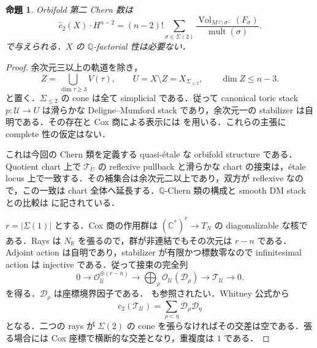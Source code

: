 \documentclass[12pt]{amsart}
\theoremstyle{definition}
\theoremstyle{remark}
\numberwithin{equation}{section}
\theoremstyle{plain}
\newtheorem{jprop}[thm]{命題}
\theoremstyle{definition}
\theoremstyle{remark}
\begin{document}
\begin{jprop}\label{ja:prop:chern}
Orbifold 第二 Chern 数は
\begin{equation}\label{ja:eq:chern}
 \widehat c_2(X)\cdot H^{n-2}
 =(n-2)!\sum_{\sigma\in\Sigma(2)}
 \frac{\operatorname{Vol}_{M\cap\sigma^\perp}(F_\sigma)}
      {\operatorname{mult}(\sigma)}.
\end{equation}
で与えられる．$X$ の $\mathbb Q$-factorial 性は必要ない．
\end{jprop}
\begin{proof}
余次元三以上の軌道を除き，
\begin{equation}\label{ja:eq:open}
 Z=\bigcup_{\dim\tau\ge3}V(\tau),\qquad
 U=X\setminus Z=X_{\Sigma_{\le2}},\qquad
 \dim Z\le n-3.
\end{equation}
と置く．$\Sigma_{\le2}$ の cone は全て simplicial である．従って canonical toric stack $p:\mathcal U\to U$ は滑らかな Deligne--Mumford stack であり，余次元一の stabilizer は自明である．その存在と Cox 商による表示には \cite[Theorem~4.11 and Corollary~4.13]{ja:FMN} を用いる．これらの主張に complete 性の仮定はない．

これは今回の Chern 類を定義する quasi-\'{e}tale な orbifold structure である．Quotient chart 上で $\mathcal T_U$ の reflexive pullback と滑らかな chart の接束は，\'{e}tale locus 上で一致する．その補集合は余次元二以上であり，双方が reflexive なので，この一致は chart 全体へ延長する．$\mathbb Q$-Chern 類の構成と smooth DM stack との比較は \cite[Theorem~3.13 and \S\S3.10--3.11 of the arXiv version]{ja:GKPT} に記されている．

$r=|\Sigma(1)|$ とする．Cox 商の作用群は $(\mathbb C^*)^r\to T_N$ の diagonalizable な核である．Rays は $N_{\mathbb R}$ を張るので，群が非連結でもその次元は $r-n$ である．Adjoint action は自明であり，stabilizer が有限かつ標数零なので infinitesimal action は injective である．従って接束の完全列
\begin{equation}\label{ja:eq:euler-stack}
 0\longrightarrow\mathcal O_{\mathcal U}^{\oplus(r-n)}
 \longrightarrow\bigoplus_\rho\mathcal O_{\mathcal U}(\mathcal D_\rho)
 \longrightarrow\mathcal T_{\mathcal U}\longrightarrow0.
\end{equation}
を得る．$\mathcal D_\rho$ は座標境界因子である．\cite[\S4.1]{ja:EM} も参照されたい．Whitney 公式から
\[
c_2(\mathcal T_{\mathcal U})
=\sum_{\rho<\eta}\mathcal D_\rho\mathcal D_\eta
\]
となる．二つの rays が $\Sigma(2)$ の cone を張らなければその交差は空である．張る場合には Cox 座標で横断的な交差となり，重複度は $1$ である．


\end{proof}
\end{document}

